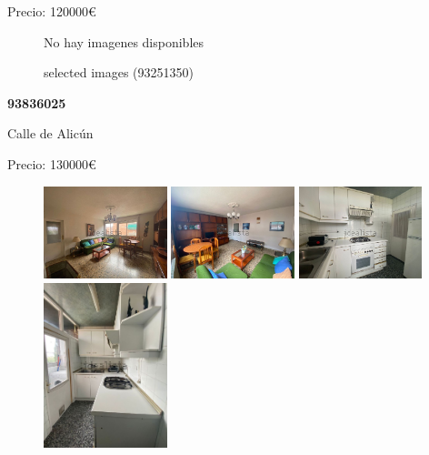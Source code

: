 \documentclass[10pt,a4paper]{report}
\begin{document}
Precio: 120000€
\begin{figure}[htbp]
No hay imagenes disponibles
\caption{selected images (93251350)}
\end{figure}
\newpage
\begin{center}
\begin{large}
\textbf{93836025}\\[10px]
\end{large}
Calle de Alicún
\end{center}
Precio: 130000€
\begin{figure}[htbp]

\includegraphics[width=0.32\textwidth]{arfima/93836025/93836025-001.jpg}
\includegraphics[width=0.32\textwidth]{arfima/93836025/93836025-002.jpg}
\includegraphics[width=0.32\textwidth]{arfima/93836025/93836025-003.jpg}
\includegraphics[width=0.32\textwidth]{arfima/93836025/93836025-004.jpg}

\end{figure}
\end{document}

